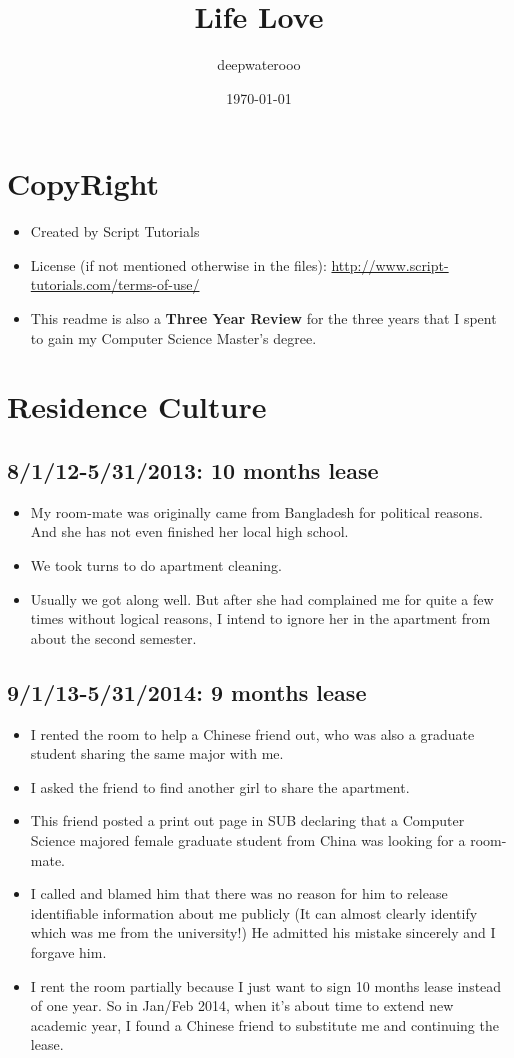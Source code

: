\documentclass[9pt,b5paper]{article}
\author{deepwaterooo}
\date{\today}
\title{Life Love}
\begin{document}
\maketitle
\tableofcontents


\section{CopyRight}
\label{sec-1}
\begin{itemize}
\item Created by Script Tutorials
\item License (if not mentioned otherwise in the files): \url{http://www.script-tutorials.com/terms-of-use/}
\item This readme is also a \textbf{Three Year Review} for the three years that I spent to gain my Computer Science Master's degree.
\end{itemize}

\section{Residence Culture}
\label{sec-2}
\subsection{8/1/12-5/31/2013: 10 months lease}
\label{sec-2-1}
\begin{itemize}
\item My room-mate was originally came from Bangladesh for political reasons. And she has not even finished her local high school.
\item We took turns to do apartment cleaning.
\item Usually we got along well. But after she had complained me for quite a few times without logical reasons, I intend to ignore her in the apartment from about the second semester.
\end{itemize}
\subsection{9/1/13-5/31/2014: 9 months lease}
\label{sec-2-2}
\begin{itemize}
\item I rented the room to help a Chinese friend out, who was also a graduate student sharing the same major with me.
\item I asked the friend to find another girl to share the apartment.
\item This friend posted a print out page in SUB declaring that a Computer Science majored female graduate student from China was looking for a room-mate.
\item I called and blamed him that there was no reason for him to release identifiable information about me  publicly (It can almost clearly identify which was me from the university!) He admitted his mistake sincerely and I forgave him.
\item I rent the room partially because I just want to sign 10 months lease instead of one year. So in Jan/Feb 2014, when it's about time to extend new academic year, I found a Chinese friend to substitute me and continuing the lease.
\end{itemize}
\end{document}
